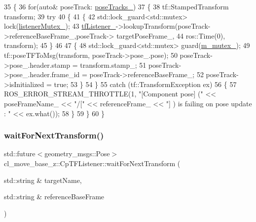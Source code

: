 \begin{DoxyCode}
35         \{
36             \textcolor{keywordflow}{for}(\textcolor{keyword}{auto}& poseTrack: \hyperlink{classcl__move__base__z_1_1CpTFListener_a22555065516af0d20ea11d72dc4daa9b}{poseTracks\_})
37             \{
38                 tf::StampedTransform transform;
39                 \textcolor{keywordflow}{try}
40                 \{
41                     \{
42                         std::lock\_guard<std::mutex> lock(\hyperlink{classcl__move__base__z_1_1CpTFListener_aaf49a2f8524426920ae22fbc692a853d}{listenerMutex\_});
43                         \hyperlink{classcl__move__base__z_1_1CpTFListener_a9a01782f5bd1ef2751b8044b2b5b3285}{tfListener\_}->lookupTransform(poseTrack->referenceBaseFrame\_,poseTrack->
      targetPoseFrame\_,
44                                                     ros::Time(0), transform);
45                     \}
46 
47                     \{
48                         std::lock\_guard<std::mutex> guard(\hyperlink{classcl__move__base__z_1_1CpTFListener_adf87e22c71f56e64622e7046bcf68ffe}{m\_mutex\_});
49                         tf::poseTFToMsg(transform, poseTrack->pose\_.pose);
50                         poseTrack->pose\_.header.stamp = transform.stamp\_;
51                         poseTrack->pose\_.header.frame\_id = poseTrack->referenceBaseFrame\_;
52                         poseTrack->isInitialized = \textcolor{keyword}{true};
53                     \}
54                 \}
55                 \textcolor{keywordflow}{catch} (tf::TransformException ex)
56                 \{
57                     ROS\_ERROR\_STREAM\_THROTTLE(1, \textcolor{stringliteral}{"[Component pose] ("} << poseFrameName\_ << \textcolor{stringliteral}{"/["} << 
      referenceFrame\_ << \textcolor{stringliteral}{"] ) is failing on pose update : "} << ex.what());
58                 \}
59             \}
60         \}
\end{DoxyCode}
\mbox{\label{classcl__move__base__z_1_1CpTFListener_a26977736e54c6f00e55e3b8e7247fa85}} 
\subsubsection{\texorpdfstring{wait\+For\+Next\+Transform()}{waitForNextTransform()}}
{\footnotesize\ttfamily std\+::future$<$geometry\+\_\+msgs\+::\+Pose$>$ cl\+\_\+move\+\_\+base\+\_\+z\+::\+Cp\+T\+F\+Listener\+::wait\+For\+Next\+Transform (\begin{DoxyParamCaption}\item[{std\+::string \&}]{target\+Name,  }\item[{std\+::string \&}]{reference\+Base\+Frame }\end{DoxyParamCaption})\hspace{0.3cm}{\ttfamily [inline]}}



